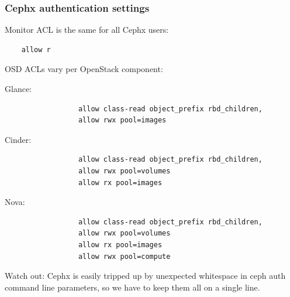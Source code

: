 \documentclass[hyperref=unicode,utf8,xcolor=pst]{beamer}
\begin{document}
\begin{frame}[fragile]
	\frametitle{Cephx authentication settings}
	\lstset{basicstyle=\ttfamily\footnotesize}

	Monitor ACL is the same for {\color{mirantisred}all} Cephx users:
	\vspace{-1ex}
	\begin{lstlisting}
	allow r
	\end{lstlisting}
	\vspace{1ex}

	OSD ACLs vary per OpenStack component:
	\vspace{-1ex}
	\begin{description}
		\item[Glance:]
			\begin{lstlisting}
			allow class-read object_prefix rbd_children,
			allow rwx pool=images
			\end{lstlisting}

		\vspace{-1.5ex}
		\item[Cinder:]
			\begin{lstlisting}
			allow class-read object_prefix rbd_children,
			allow rwx pool=volumes
			allow rx pool=images
			\end{lstlisting}

		\vspace{-1.5ex}
		\item[Nova:]
			\begin{lstlisting}
			allow class-read object_prefix rbd_children,
			allow rwx pool=volumes
			allow rx pool=images
			allow rwx pool=compute
			\end{lstlisting}
	\end{description}

	{\color{mirantisred}Watch out:} Cephx is easily tripped up by
	unexpected whitespace in ceph auth command line parameters, so
	we have to keep them all on a single line.
\end{frame}
\end{document}

